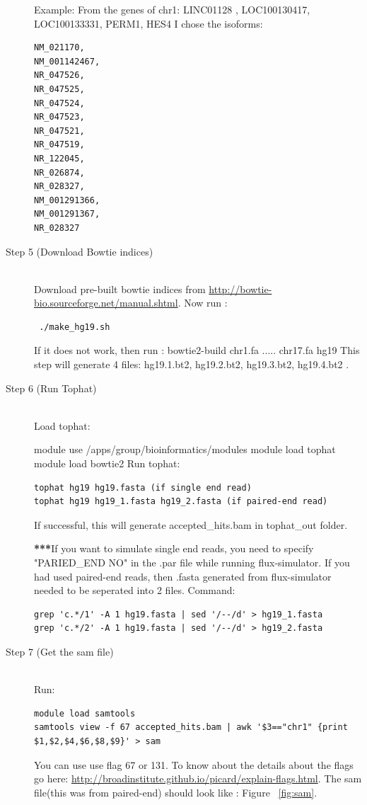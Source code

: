 \documentclass{article}
\begin{document}
\begin{description}
Example: \newline
From the genes of chr1:
LINC01128 , LOC100130417, LOC100133331, PERM1, HES4\newline
I chose the isoforms: 
\begin{verbatim}
NM_021170,
NM_001142467,
NR_047526,
NR_047525,
NR_047524,
NR_047523,
NR_047521,
NR_047519,
NR_122045,
NR_026874,
NR_028327,
NM_001291366,
NM_001291367,
NR_028327
\end{verbatim}

\item[Step 5 (Download Bowtie indices)] \hfill \\
Download pre-built bowtie indices from \url{http://bowtie-bio.sourceforge.net/manual.shtml}. \newline
Now run : \begin{verbatim} ./make_hg19.sh \end{verbatim} If it does not work, then run : bowtie2-build chr1.fa ..... chr17.fa hg19 \newline
This step will generate 4 files: hg19.1.bt2, hg19.2.bt2, hg19.3.bt2, hg19.4.bt2 .

\item[Step 6 (Run Tophat)] \hfill \\
Load tophat:

module use /apps/group/bioinformatics/modules \newline
module load tophat \newline
module load bowtie2 \newline
Run tophat: \newline
\begin{verbatim} 
tophat hg19 hg19.fasta (if single end read) 
tophat hg19 hg19_1.fasta hg19_2.fasta (if paired-end read)
\end{verbatim}

If successful, this will generate accepted\_hits.bam in tophat\_out folder.

\textbf{***}If you want to simulate single end reads, you need to specify "PARIED\_END NO" in the .par file while running flux-simulator.
If you had used paired-end reads, then .fasta generated from flux-simulator needed to be seperated into 2 files.\newline
Command:
\begin{verbatim} 
grep 'c.*/1' -A 1 hg19.fasta | sed '/--/d' > hg19_1.fasta
grep 'c.*/2' -A 1 hg19.fasta | sed '/--/d' > hg19_2.fasta
 \end{verbatim}

\item[Step 7 (Get the sam file)] \hfill \\
Run:
\begin{verbatim} 
module load samtools
samtools view -f 67 accepted_hits.bam | awk '$3=="chr1" {print $1,$2,$4,$6,$8,$9}' > sam
\end{verbatim}
You can use use flag 67 or 131. To know about the details about the flags go here: \url{http://broadinstitute.github.io/picard/explain-flags.html}.
The sam file(this was from paired-end) should look like : 
Figure ~\ref{fig:sam}.


\end{description}
\end{document}

